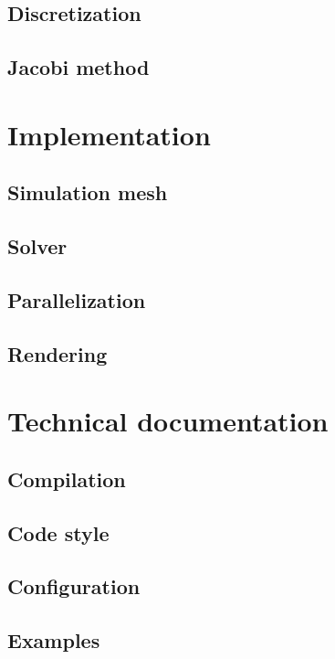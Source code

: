 \documentclass[12pt]{article}
\begin{document}
\subsection{Discretization}

\subsection{Jacobi method}

\section{Implementation}

\subsection{Simulation mesh}

\subsection{Solver}

\subsection{Parallelization}

\subsection{Rendering}

\section{Technical documentation}

\subsection{Compilation}

\subsection{Code style}

\subsection{Configuration}

\subsection{Examples}

\begin{thebibliography}{9}


\end{thebibliography}
\end{document}
